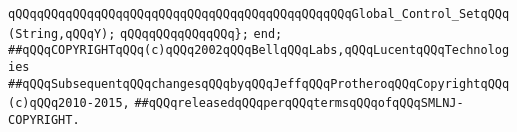 \verb|qQQqqQQqqQQqqQQqqQQqqQQqqQQqqQQqqQQqqQQqqQQqqQQqGlobal_Control_SetqQQq(String,qQQqY);|\newline
\verb|qQQqqQQqqQQqqQQq};|\newline
\verb|end;|\newline
\newline
\verb|##qQQqCOPYRIGHTqQQq(c)qQQq2002qQQqBellqQQqLabs,qQQqLucentqQQqTechnologies|\newline
\verb|##qQQqSubsequentqQQqchangesqQQqbyqQQqJeffqQQqProtheroqQQqCopyrightqQQq(c)qQQq2010-2015,|\newline
\verb|##qQQqreleasedqQQqperqQQqtermsqQQqofqQQqSMLNJ-COPYRIGHT.|\newline

